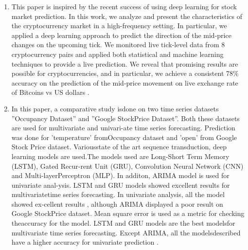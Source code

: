 \documentclass[12pt,journal,compsoc]{IEEEtran}
\begin{document}
\begin{enumerate}
	\item This paper is inspired by the recent success of using deep learning for stock market prediction. In this work, we analyze and present the characteristics of the cryptocurrency market in a high-frequency setting. In particular, we applied a deep learning approach to predict the direction of the mid-price changes on the upcoming tick. We monitored live tick-level data from 8 cryptocurrency pairs and applied both statistical and machine learning techniques to provide a live prediction. We reveal that promising results are possible for cryptocurrencies, and in particular, we achieve a consistent 78\% accuracy on the prediction of the mid-price movement on live exchange rate of Bitcoins vs US dollars \cite{fang2020ascertaining}. 
	
	\item In this paper, a comparative study isdone on two time series datasets ”Occupancy Dataset” and ”Google StockPrice Dataset”. Both these datasets are used for multivariate and univari-ate time series forecasting. Prediction was done for ’temperature’ fromOccupancy dataset and ’open’ from Google Stock Price dataset. Variousstate of the art sequence transduction, deep learning models are used.The models used are Long-Short Term Memory (LSTM), Gated Recur-rent Unit (GRU), Convolution Neural Network (CNN) and Multi-layerPerceptron (MLP). In additon, ARIMA model is used for univariate anal-ysis. LSTM and GRU models showed excellent results for multivariatetime series forecasting. In univariate analysis, all the model showed ex-cellent results , although ARIMA displayed a poor result on Google StockPrice dataset.  Mean square error is used as a metric for checking theaccuracy for the model.  LSTM and GRU models are the best modelsfor multivariate time series forecasting. Except ARIMA, all the modelsdescribed have a higher accuracy for univariate prediction \cite{tiwari2020comparative}.
	

\end{enumerate}
\end{document}
